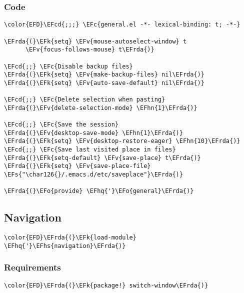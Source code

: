 \documentclass[a4wide,10pt]{article}
\newcommand{\EFc}[1]{\textcolor{EFc}{#1}} %
\newcommand{\EFcd}[1]{\textcolor{EFcd}{#1}} %
\newcommand{\EFs}[1]{\textcolor{EFs}{#1}} %
\newcommand{\EFk}[1]{\textcolor{EFk}{#1}} %
\newcommand{\EFv}[1]{\textcolor{EFv}{#1}} %
\newcommand{\EFo}[1]{\textcolor{EFo}{#1}} %
\newcommand{\EFhn}[1]{\textcolor{EFhn}{\textbf{#1}}} %
\newcommand{\EFhq}[1]{\textcolor{EFhq}{#1}} %
\newcommand{\EFhs}[1]{\textcolor{EFhs}{#1}} %
\newcommand{\EFrda}[1]{\textcolor{EFrda}{#1}} %
\begin{document}
\subsubsection{Code}
\label{sec:org8ee6aea}
\begin{Code}
\begin{Verbatim}
\color{EFD}\EFcd{;;;} \EFc{general.el -*- lexical-binding: t; -*-}

\EFrda{(}\EFk{setq} \EFv{mouse-autoselect-window} t
      \EFv{focus-follows-mouse} t\EFrda{)}

\EFcd{;;} \EFc{Disable backup files}
\EFrda{(}\EFk{setq} \EFv{make-backup-files} nil\EFrda{)}
\EFrda{(}\EFk{setq} \EFv{auto-save-default} nil\EFrda{)}

\EFcd{;;} \EFc{Delete selection when pasting}
\EFrda{(}\EFv{delete-selection-mode} \EFhn{1}\EFrda{)}

\EFcd{;;} \EFc{Save the session}
\EFrda{(}\EFv{desktop-save-mode} \EFhn{1}\EFrda{)}
\EFrda{(}\EFk{setq} \EFv{desktop-restore-eager} \EFhn{10}\EFrda{)}
\EFcd{;;} \EFc{Save last visited place in files}
\EFrda{(}\EFk{setq-default} \EFv{save-place} t\EFrda{)}
\EFrda{(}\EFk{setq} \EFv{save-place-file} \EFs{"\char126{}/.emacs.d/etc/saveplace"}\EFrda{)}

\EFrda{(}\EFo{provide} \EFhq{'}\EFo{general}\EFrda{)}
\end{Verbatim}
\end{Code}
\subsection{Navigation}
\label{sec:org462d104}
\begin{Code}
\begin{Verbatim}
\color{EFD}\EFrda{(}\EFk{load-module} \EFhq{'}\EFhs{navigation}\EFrda{)}
\end{Verbatim}
\end{Code}
\subsubsection{Requirements}
\label{sec:orga2422eb}
\begin{Code}
\begin{Verbatim}
\color{EFD}\EFrda{(}\EFk{package!} switch-window\EFrda{)}
\end{Verbatim}
\end{Code}
\end{document}
